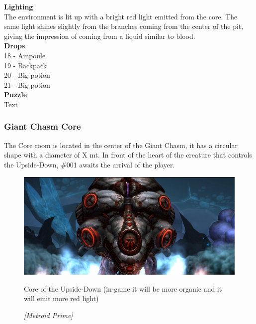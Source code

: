 \textbf{Lighting}\\
The environment is lit up with a bright red light emitted from the core. The same light shines slightly from the branches coming from the center of the pit, giving the impression of coming from a liquid similar to blood.\\

\textbf{Drops}\\
18 - Ampoule\\
19 - Backpack\\
20 - Big potion\\
21 - Big potion\\

\textbf{Puzzle}\\
Text\\

\newpage


\subsubsection{Giant Chasm Core}
The Core room is located in the center of the Giant Chasm, it has a circular shape with a diameter of X mt. In front of the heart of the creature that controls the Upside-Down, \#001 awaits the arrival of the player.

\vspace*{0.3cm}
\begin{figure}[H]
	\centering
	\includegraphics[width=0.8\linewidth]{images/visual_ref/15_giant_chasm/chasm_core.png}
	\caption*{Core of the Upside-Down (in-game it will be more organic and it will emit more red light)}
	\caption{ \textit{[Metroid Prime]}}
\end{figure}


